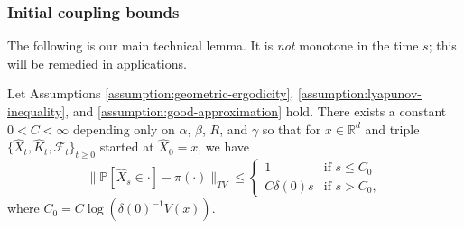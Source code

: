 \subsubsection{Initial coupling bounds}

The following is our main technical lemma. It is \textit{not} monotone in the time $s$; this will be remedied in applications.
\begin{lemma}
 Let Assumptions \ref{assumption:geometric-ergodicity}, \ref{assumption:lyapunov-inequality}, and \ref{assumption:good-approximation} hold. There exists a constant $0 < C < \infty$ depending only on $\alpha$, $\beta$, $R$, and $\gamma$ so that for $x \in \mathbb{R}^{d}$ and triple $\{\hat{X}_t, \hat{K}_t, \mathcal{F}_t\}_{t \geq 0}$ started at $\hat{X}_0 = x$, we have 
 \begin{equation*}
\| \mathbb{P}[\hat{X}_s \in \cdot] - \pi(\cdot) \|_{TV} \leq \begin{cases}
1 & \mbox{if } s \leq C_0 \\
 C \delta(0) s & \mbox{if } s > C_0,
\end{cases}
 \end{equation*}
 where $C_0 = C \log{(\delta(0)^{-1}V(x))}$.
 \label{lem:approx-chain-bound}
\end{lemma}

